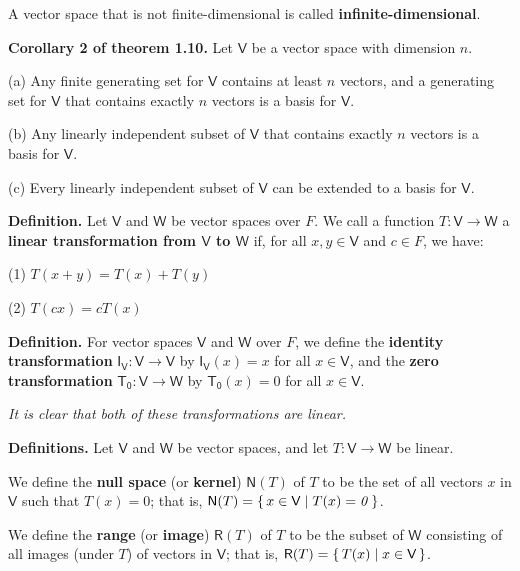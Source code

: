 \documentclass{article}
\newcommand{\0}{\mathit{0}}
\begin{document}
A vector space that is not finite-dimensional is called \textbf{infinite-dimensional}.

\medskip

\textbf{Corollary 2 of theorem 1.10.} Let $\mathsf{V}$ be a vector space with dimension $n$.

(a) Any finite generating set for $\mathsf{V}$ contains at least $n$ vectors,
and a generating set for $\mathsf{V}$ that contains exactly $n$ vectors
is a basis for $\mathsf{V}$.

(b) Any linearly independent subset of $\mathsf{V}$ that contains exactly
$n$ vectors is a basis for $\mathsf{V}$.

(c) Every linearly independent subset of $\mathsf{V}$ can be extended to
a basis for $\mathsf{V}$.

\medskip

\textbf{Definition.}
Let $\mathsf{V}$ and $\mathsf{W}$ be vector spaces over $F$. We call a function
$T: \mathsf{V} \to \mathsf{W}$ a \textbf{linear transformation from $\mathsf{V}$ to $\mathsf{W}$} if,
for all $x, y \in \mathsf{V}$ and $c \in F$, we have:

(1) $T(x + y) = T(x) + T(y)$

(2) $T(cx) = cT(x)$

\medskip

\textbf{Definition.} For vector spaces $\mathsf{V}$ and $\mathsf{W}$ over $F$, we define the
\textbf{identity transformation} $\mathsf{I_V}: \mathsf{V} \to \mathsf{V}$
by $\mathsf{I_V}(x) = x$ for all $x \in \mathsf{V}$,
and the \textbf{zero transformation} $\mathsf{T_0}: \mathsf{V} \to \mathsf{W}$
by $\mathsf{T_0}(x) = \0$ for all $x \in \mathsf{V}$.

\textsl{It is clear that both of these transformations are linear.}

\medskip

\textbf{Definitions.} Let $\mathsf{V}$ and $\mathsf{W}$ be vector spaces, and let
$T: \mathsf{V} \to \mathsf{W}$ be linear.

We define the \textbf{null space} (or \textbf{kernel}) $\mathsf{N}(T)$ of $T$ to be the set of all vectors
$x$ in $\mathsf{V}$ such that $T(x) = \0$; that is,
$\mathsf{N}(T) = \set{x \in \mathsf{V} \mid T(x) = \0}$.

We define the \textbf{range} (or \textbf{image}) $\mathsf{R}(T)$ of $T$ to be the subset of $\mathsf{W}$
consisting of all images (under $T$) of vectors in $\mathsf{V}$; that is,
$\mathsf{R}(T) = \set{T(x) \mid x \in \mathsf{V}}$.
\end{document}
